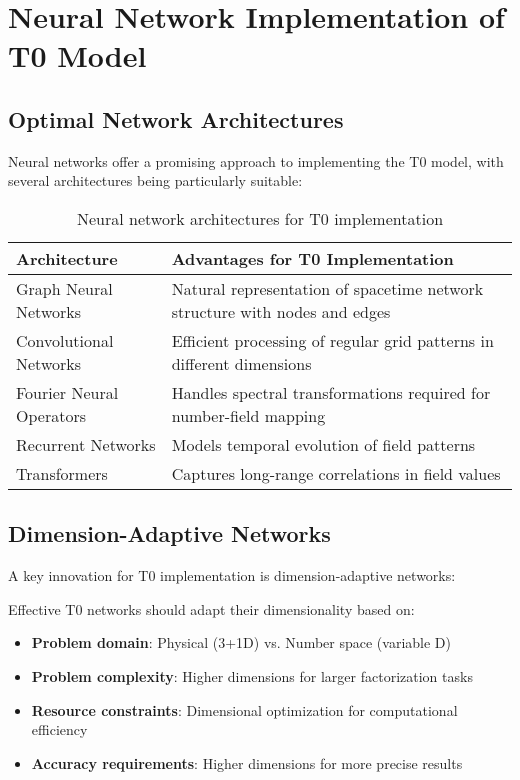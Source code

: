 \documentclass[12pt,a4paper]{article}
\begin{document}
	\section{Neural Network Implementation of T0 Model}
	\label{sec:neural_network}
	
	\subsection{Optimal Network Architectures}
	\label{subsec:optimal_architectures}
	
	Neural networks offer a promising approach to implementing the T0 model, with several architectures being particularly suitable:
	
	\begin{table}[htbp]
		\centering
		\begin{tabular}{lp{8cm}}
			\toprule
			\textbf{Architecture} & \textbf{Advantages for T0 Implementation} \\
			\midrule
			Graph Neural Networks & Natural representation of spacetime network structure with nodes and edges \\
			Convolutional Networks & Efficient processing of regular grid patterns in different dimensions \\
			Fourier Neural Operators & Handles spectral transformations required for number-field mapping \\
			Recurrent Networks & Models temporal evolution of field patterns \\
			Transformers & Captures long-range correlations in field values \\
			\bottomrule
		\end{tabular}
		\caption{Neural network architectures for T0 implementation}
		\label{tab:network_architectures}
	\end{table}
	
	\subsection{Dimension-Adaptive Networks}
	\label{subsec:dimension_adaptive}
	
	A key innovation for T0 implementation is dimension-adaptive networks:
	
	\begin{tcolorbox}[colback=yellow!5!white,colframe=orange!75!black,title=Dimension-Adaptive Network Design]
		Effective T0 networks should adapt their dimensionality based on:
		\begin{itemize}
			\item \textbf{Problem domain}: Physical (3+1D) vs. Number space (variable D)
			\item \textbf{Problem complexity}: Higher dimensions for larger factorization tasks
			\item \textbf{Resource constraints}: Dimensional optimization for computational efficiency
			\item \textbf{Accuracy requirements}: Higher dimensions for more precise results
		\end{itemize}
	\end{tcolorbox}
	
\end{document}
